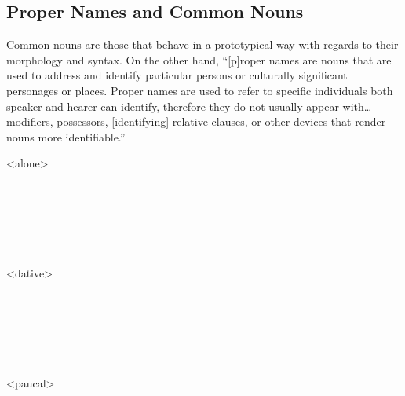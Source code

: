 \subsection{Proper Names and Common Nouns}
\label{subsubsec:tvk-nouns-proper}

Common nouns are those that behave in a prototypical way with regards to their morphology and syntax. On the other hand, \enquote{[p]roper names are nouns that are used to address and identify particular persons or culturally significant personages or places. Proper names are used to refer to specific individuals both speaker and hearer can identify, therefore they do not usually appear with… modifiers, possessors, [identifying] relative clauses, or other devices that render nouns more identifiable.}\autocite[39]{descms}

\hspace{1.72em}\remainpex\begin{minipage}[t]{0.5\remaining}\end{minipage}\begin{minipage}[t]{0.5\remaining}\end{minipage}
	\a<alone>\remainpex\begin{minipage}[t]{0.5\remaining}
		\\
		\\
	\end{minipage}
	\begin{minipage}[t]{0.5\remaining}
		\\
		\\
	\end{minipage}
	\a<dative>\remainpex\begin{minipage}[t]{0.5\remaining}
		\\
		\\
	\end{minipage}
	\begin{minipage}[t]{0.5\remaining}
		\\
		\\
	\end{minipage}
	\a<paucal>\remainpex\begin{minipage}[t]{0.5\remaining}
		\\
		\\
	\end{minipage}
